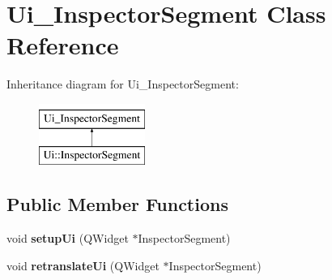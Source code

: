 \hypertarget{class_ui___inspector_segment}{}\section{Ui\+\_\+\+Inspector\+Segment Class Reference}
\label{class_ui___inspector_segment}
Inheritance diagram for Ui\+\_\+\+Inspector\+Segment\+:\begin{figure}[H]
\begin{center}
\leavevmode
\includegraphics[height=2.000000cm]{class_ui___inspector_segment}
\end{center}
\end{figure}
\subsection*{Public Member Functions}
\begin{DoxyCompactItemize}
\item 
\mbox{\label{class_ui___inspector_segment_acc3d4378078012bce5b525acea3ab26f}} 
void {\bfseries setup\+Ui} (Q\+Widget $\ast$Inspector\+Segment)
\item 
\mbox{\label{class_ui___inspector_segment_a77e3191008fd83709fd88e0cc53fd0d2}} 
void {\bfseries retranslate\+Ui} (Q\+Widget $\ast$Inspector\+Segment)
\end{DoxyCompactItemize}
